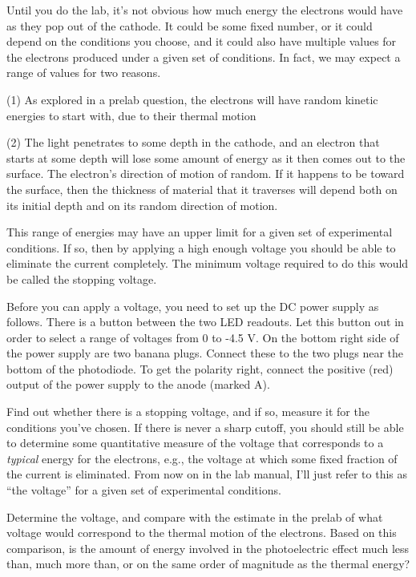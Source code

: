 
Until you do the lab, it's not obvious how much energy the electrons would have
as they pop out of the cathode. It could be some fixed number, or it could depend on the
conditions you choose, and it could also have multiple values for the electrons produced
under a given set of conditions. In fact, we may expect a range of values for two reasons.

(1) As explored in a prelab question, the electrons will have random kinetic energies to start
with, due to their thermal motion

(2) The light penetrates to some depth in the cathode,
and an electron that starts at some depth will lose some amount of energy as it then comes out
to the surface. The electron's direction of motion of random. If it happens to be toward the
surface, then the thickness of material that it traverses will depend both on its initial
depth and on its random direction of motion.

This range of energies may have an upper limit for a given set of experimental conditions.
If so, then by applying a high enough voltage you should be able to eliminate the current
completely. The minimum voltage required to do this would be called the stopping voltage.

Before you can apply a voltage, you need to  set up the DC power supply as follows. There is a button between the
two LED readouts. Let this button out in order to select a range of voltages from 0 to -4.5 V.
On the bottom right side of the power supply are two banana plugs. Connect these to the
two plugs near the bottom of the photodiode. To get the polarity right, connect the 
positive (red) output of the power supply to the anode (marked A).

Find out whether there is a stopping voltage, and if so, measure it for the conditions you've chosen.
If there is never a sharp cutoff, you should still be able to determine some quantitative measure
of the voltage that corresponds to a \emph{typical} energy for the electrons, e.g., the voltage at
which some fixed fraction of the current is eliminated. From now on in the lab manual, I'll
just refer to this as ``the voltage'' for a given set of experimental conditions.

Determine the voltage, and compare with the estimate in the prelab of what voltage would
correspond to the thermal motion of the electrons. Based on this comparison, is the amount of
energy involved in the photoelectric effect much less than, much more than, or on the same
order of magnitude as the thermal energy?

